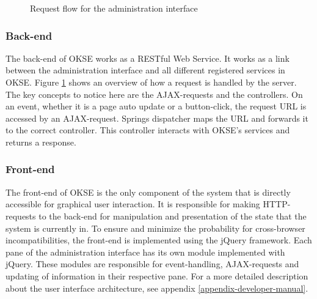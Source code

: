 \begin{center}
  \begin{figure}[ht!]
    \caption{Request flow for the administration interface}
    \label{fig:oac-request-flow}
  \end{figure}
\end{center}

\subsubsection{Back-end}

The back-end of OKSE works as a RESTful Web Service. It works as a link between the administration interface and all different registered services in OKSE. Figure \ref{fig:oac-request-flow} shows an overview of how a request is handled by the server. The key concepts to notice here are the AJAX-requests and the controllers. On an event, whether it is a page auto update or a button-click, the request URL is accessed by an AJAX-request. Springs dispatcher maps the URL and forwards it to the correct controller. This controller interacts with OKSE's services and returns a response. 

\subsubsection{Front-end}

The front-end of OKSE is the only component of the system that is directly accessible for graphical user interaction. It is responsible for making HTTP-requests to the back-end for manipulation and presentation of the state that the system is currently in. To ensure and minimize the probability for cross-browser incompatibilities, the front-end is implemented using the jQuery framework. Each pane of the administration interface has its own module implemented with jQuery. These modules are responsible for event-handling, AJAX-requests and updating of information in their respective pane.
For a more detailed description about the user interface architecture, see appendix \ref{appendix-developer-manual}.

\clearpage
